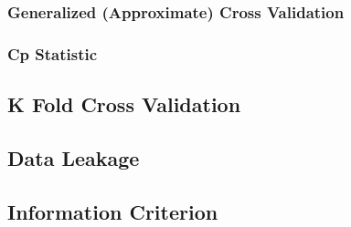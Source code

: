 \documentclass{article}
\begin{document}
    \subsubsection{Generalized (Approximate) Cross Validation} 

    \subsubsection{Cp Statistic}

  \subsection{K Fold Cross Validation}

  \subsection{Data Leakage}

  \subsection{Information Criterion}



\end{document}
